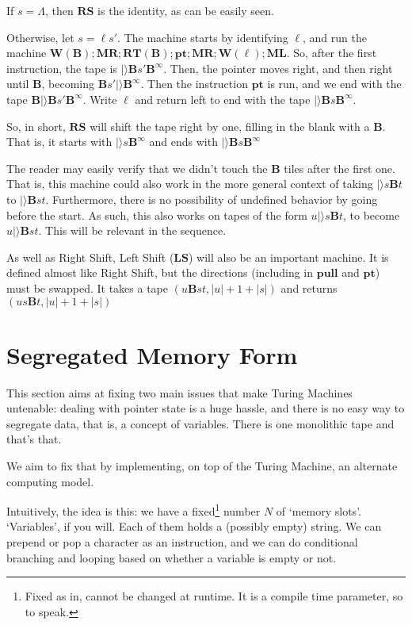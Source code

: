 \documentclass{article}
\newcommand{\B}{\mathbf{B}}
\newcommand{\MR}{\mathbf{MR}}
\newcommand{\ML}{\mathbf{ML}}
\newcommand{\W}{\mathbf{W}}
\newcommand{\RT}{\mathbf{RT}}
\newcommand{\pull}{\mathbf{pull}}
\newcommand{\pt}{\mathbf{pt}}
\newcommand{\RS}{\mathbf{RS}}
\newcommand{\LS}{\mathbf{LS}}
\begin{document}
	If $s = \Lambda$, then $\RS$ is the identity, as can be easily seen.
	
	Otherwise, let $s = \ell s'$. The machine starts by identifying $\ell$, and run the machine $\W(\B); \MR; \RT(\B); \pt; \MR; \W(\ell); \ML$. So, after the first instruction, the tape is $|\rangle \B s' \B^\infty$. Then, the pointer moves right, and then right until $\B$, becoming $\B s' |\rangle \B^\infty$. Then the instruction $\pt$ is run, and we end with the tape $\B |\rangle \B s' \B^\infty$. Write $\ell$ and return left to end with the tape $|\rangle \B s \B^\infty$.
	
	So, in short, $\RS$ will shift the tape right by one, filling in the blank with a $\B$. That is, it starts with $|\rangle s \B^\infty$ and ends with $|\rangle \B s \B^\infty$
	
	The reader may easily verify that we didn't touch the $\B$ tiles after the first one. That is, this machine could also work in the more general context of taking $|\rangle s \B t$ to $|\rangle \B s t$. Furthermore, there is no possibility of undefined behavior by going before the start. As such, this also works on tapes of the form $u |\rangle s \B t$, to become $u |\rangle \B s t$. This will be relevant in the sequence.
	
	As well as Right Shift, Left Shift ($\LS$) will also be an important machine. It is defined almost like Right Shift, but the directions (including in $\pull$ and $\pt$) must be swapped. It takes a tape $(u \B s t, \lvert u \rvert + 1 + \lvert s \rvert)$ and returns $(u s \B t, \lvert u \rvert + 1 + \lvert s \rvert)$
	
	\section{Segregated Memory Form}
	
	This section aims at fixing two main issues that make Turing Machines untenable: dealing with pointer state is a huge hassle, and there is no easy way to segregate data, that is, a concept of variables. There is one monolithic tape and that's that.
	
	We aim to fix that by implementing, on top of the Turing Machine, an alternate computing model.
	
	Intuitively, the idea is this: we have a fixed\footnote{Fixed as in, cannot be changed at runtime. It is a compile time parameter, so to speak.} number $N$ of `memory slots'. `Variables', if you will. Each of them holds a (possibly empty) string. We can prepend or pop a character as an instruction, and we can do conditional branching and looping based on whether a variable is empty or not. %
	
\end{document}
